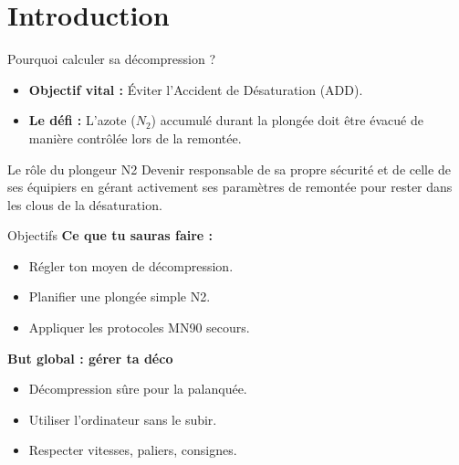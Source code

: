 \section{Introduction}

\begin{frame}{Pourquoi calculer sa décompression ?}
    \begin{itemize}
        \item \textbf{Objectif vital :} Éviter l'Accident de Désaturation (ADD).
        \item \textbf{Le défi :} L'azote ($N_2$) accumulé durant la plongée doit être évacué de manière contrôlée lors de la remontée.
    \end{itemize}
    
    \begin{block}{Le rôle du plongeur N2}
        Devenir responsable de sa propre sécurité et de celle de ses équipiers en gérant activement ses paramètres de remontée pour rester dans les clous de la désaturation.
    \end{block}
\end{frame}

\begin{frame}{Objectifs}
    \textbf{Ce que tu sauras faire :}
    \begin{itemize}
        \item Régler ton moyen de décompression.
        \item Planifier une plongée simple N2.
        \item Appliquer les protocoles MN90 secours.
    \end{itemize}

    \vspace{0.3cm}
    \textbf{But global : gérer ta déco}
    \begin{itemize}
        \item Décompression sûre pour la palanquée.
        \item Utiliser l'ordinateur sans le subir.
        \item Respecter vitesses, paliers, consignes.
    \end{itemize}
\end{frame}

